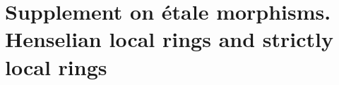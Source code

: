 \section{Supplement on \'etale morphisms. Henselian local rings and strictly local rings}
\label{section:IV.18}

